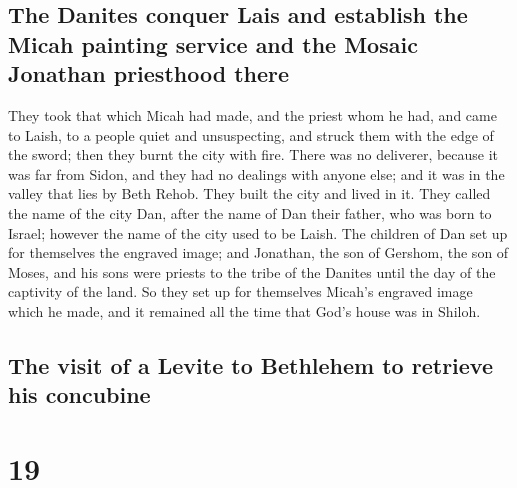 \hypertarget{the-danites-conquer-lais-and-establish-the-micah-painting-service-and-the-mosaic-jonathan-priesthood-there}{%
\subsection{The Danites conquer Lais and establish the Micah painting
service and the Mosaic Jonathan priesthood
there}\label{the-danites-conquer-lais-and-establish-the-micah-painting-service-and-the-mosaic-jonathan-priesthood-there}}

 They took that which Micah had made, and the priest whom
he had, and came to Laish, to a people quiet and unsuspecting, and
struck them with the edge of the sword; then they burnt the city with
fire.  There was no deliverer, because it was far from
Sidon, and they had no dealings with anyone else; and it was in the
valley that lies by Beth Rehob. They built the city and lived in it.
 They called the name of the city Dan, after the name of
Dan their father, who was born to Israel; however the name of the city
used to be Laish.  The children of Dan set up for
themselves the engraved image; and Jonathan, the son of Gershom, the son
of Moses, and his sons were priests to the tribe of the Danites until
the day of the captivity of the land.  So they set up for
themselves Micah's engraved image which he made, and it remained all the
time that God's house was in Shiloh.

\hypertarget{the-visit-of-a-levite-to-bethlehem-to-retrieve-his-concubine}{%
\subsection{The visit of a Levite to Bethlehem to retrieve his
concubine}\label{the-visit-of-a-levite-to-bethlehem-to-retrieve-his-concubine}}

\hypertarget{section-18}{%
\section{19}\label{section-18}}

